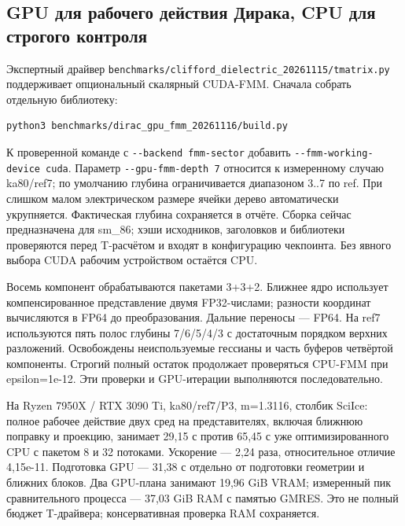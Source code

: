 \documentclass[
  russian,
  11pt,
  a4paper,
]{report}
\begin{document}
\subsection{GPU для рабочего действия Дирака, CPU для строгого
контроля}\label{gpu-ux434ux43bux44f-ux440ux430ux431ux43eux447ux435ux433ux43e-ux434ux435ux439ux441ux442ux432ux438ux44f-ux434ux438ux440ux430ux43aux430-cpu-ux434ux43bux44f-ux441ux442ux440ux43eux433ux43eux433ux43e-ux43aux43eux43dux442ux440ux43eux43bux44f}

Экспертный драйвер
\nolinkurl{benchmarks/clifford_dielectric_20261115/tmatrix.py}
поддерживает опциональный скалярный CUDA-FMM. Сначала собрать отдельную
библиотеку:

\begin{verbatim}
python3 benchmarks/dirac_gpu_fmm_20261116/build.py
\end{verbatim}

К проверенной команде с \nolinkurl{--backend fmm-sector} добавить
\nolinkurl{--fmm-working-device cuda}. Параметр
\nolinkurl{--gpu-fmm-depth 7} относится к измеренному случаю ka80/ref7;
по умолчанию глубина ограничивается диапазоном 3..7 по ref. При слишком
малом электрическом размере ячейки дерево автоматически укрупняется.
Фактическая глубина сохраняется в отчёте. Сборка сейчас предназначена
для sm\_86; хэши исходников, заголовков и библиотеки проверяются перед
T-расчётом и входят в конфигурацию чекпоинта. Без явного выбора CUDA
рабочим устройством остаётся CPU.

Восемь компонент обрабатываются пакетами 3+3+2. Ближнее ядро использует
компенсированное представление двумя FP32-числами; разности координат
вычисляются в FP64 до преобразования. Дальние переносы --- FP64. На ref7
используются пять полос глубины 7/6/5/4/3 с достаточным порядком верхних
разложений. Освобождены неиспользуемые гессианы и часть буферов
четвёртой компоненты. Строгий полный остаток продолжает проверяться
CPU-FMM при epsilon=1e-12. Эти проверки и GPU-итерации выполняются
последовательно.

На Ryzen 7950X / RTX 3090 Ti, ka80/ref7/P3, m=1.3116, столбик SciIce:
полное рабочее действие двух сред на представителях, включая ближнюю
поправку и проекцию, занимает 29,15 с против 65,45 с уже
оптимизированного CPU с пакетом 8 и 32 потоками. Ускорение --- 2,24
раза, относительное отличие 4,15e-11. Подготовка GPU --- 31,38 с
отдельно от подготовки геометрии и ближних блоков. Два GPU-плана
занимают 19,96 GiB VRAM; измеренный пик сравнительного процесса ---
37,03 GiB RAM с памятью GMRES. Это не полный бюджет T-драйвера;
консервативная проверка RAM сохраняется.
\end{document}
